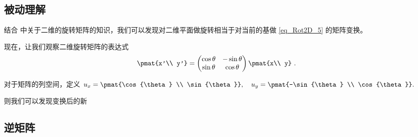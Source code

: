 \subsection{被动理解}

结合  中关于二维的旋转矩阵的知识，我们可以发现对二维平面做旋转相当于对当前的基做 \autoref{eq_Rot2D_5} 的矩阵变换。

现在，让我们观察二维旋转矩阵的表达式
\begin{equation}
\pmat{x'\\ y'} =
\begin{pmatrix}
\cos\theta & - \sin\theta\\
\sin\theta &\cos\theta
\end{pmatrix}\pmat{x\\ y}~.
\end{equation}

对于矩阵的列空间，定义 $u_{x}=\pmat{\cos{\theta} \\ \sin{\theta}} ,\quad u_{y}=\pmat{-\sin{\theta} \\ \cos{\theta}}.$

则我们可以发现变换后的新



\subsection{逆矩阵}

